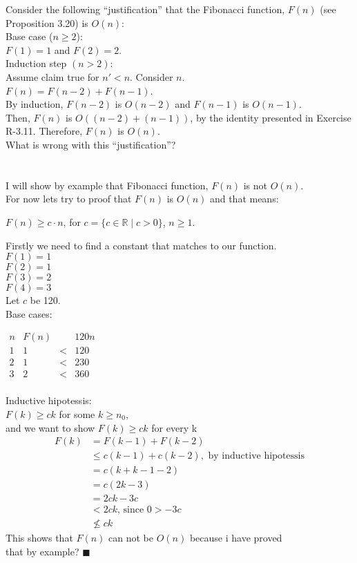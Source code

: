 \documentclass{article}
\begin{document}
Consider the following “justification” that the Fibonacci function, $F(n)$ (see Proposition 3.20) is $O(n)$: \\
Base case ($n \geq 2$):\\
$F(1) = 1$ and $F(2) = 2$.\\
Induction step $(n > 2)$:\\
Assume claim true for $n' < n$. Consider $n$. \\$ F(n) = F(n-2) +F(n-1)$. \\By induction, $F(n-2)$ is $O(n-2)$ and $F(n-1)$ is $O(n-1)$.\\ Then, $F(n)$ is $O((n-2)+(n-1))$, by the identity presented in Exercise R-3.11. Therefore, $F(n)$ is $O(n)$.\\
What is wrong with this “justification”?\\\\\\
 
I will show by example that Fibonacci function, $F(n)$ is not $O(n)$.\\
For now lets try to proof that $F(n)$ is $O(n)$ and that means:
\begin{center}
	 $F(n) \geq c \cdot n$, for $c = \{c \in \mathbb{R} \mid c > 0 \}$, $ n \geq 1 $.\\
\end{center} 
Firstly we need to find a constant that matches to our function.\\
$F(1) = 1$\\
$F(2) = 1$\\
$F(3) = 2$\\
$F(4) = 3$\\
Let $c$ be 120.\\
Base cases:
\begin{center}
	$
	\begin{array}{cccc}
	n	& F(n) & & 120n \\ 
	\hline
	1& 1 &<& 120 \\ 
	2& 1 &<& 230 \\ 
	3& 2 &<& 360 \\ 
	\end{array} 
	$
\end{center}
Inductive hipotessis:\\
$F(k) \geq ck$ for some $k \geq n_0$, \\and we want to show $F(k) \geq ck$ for every k\\

\begin{align*}
		F(k) &= F(k-1) + F(k-2)\\
			&\leq c(k-1) + c(k-2), \text{ by inductive hipotessis}\\
			&=c(k+k-1 - 2) \\
			&=c(2k - 3) \\
			&=2ck - 3c \\
			&< 2ck \text{, since }0 > -3c \\
			&\nleq ck
\end{align*}
This shows that $F(n)$ can not be $O(n)$ because i have proved \\ that by example? $ \blacksquare $
\end{document}
